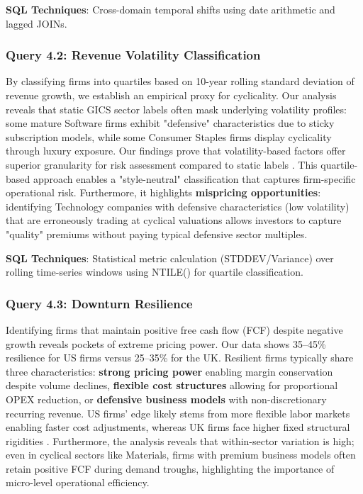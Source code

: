 \documentclass[10pt,a4paper]{article}
\begin{document}
\textbf{SQL Techniques}: Cross-domain temporal shifts using date arithmetic and lagged JOINs.


\subsubsection{Query 4.2: Revenue Volatility Classification}
By classifying firms into quartiles based on 10-year rolling standard deviation of revenue growth, we establish an empirical proxy for cyclicality. Our analysis reveals that static GICS sector labels often mask underlying volatility profiles: some mature Software firms exhibit "defensive" characteristics due to sticky subscription models, while some Consumer Staples firms display cyclicality through luxury exposure. Our findings prove that volatility-based factors offer superior granularity for risk assessment compared to static labels \cite{campbell2001}. This quartile-based approach enables a "style-neutral" classification that captures firm-specific operational risk. Furthermore, it highlights \textbf{mispricing opportunities}: identifying Technology companies with defensive characteristics (low volatility) that are erroneously trading at cyclical valuations allows investors to capture "quality" premiums without paying typical defensive sector multiples.

\textbf{SQL Techniques}: Statistical metric calculation (STDDEV/Variance) over rolling time-series windows using NTILE() for quartile classification.



\subsubsection{Query 4.3: Downturn Resilience}
Identifying firms that maintain positive free cash flow (FCF) despite negative growth reveals pockets of extreme pricing power. Our data shows 35--45\% resilience for US firms versus 25--35\% for the UK. Resilient firms typically share three characteristics: \textbf{strong pricing power} enabling margin conservation despite volume declines, \textbf{flexible cost structures} allowing for proportional OPEX reduction, or \textbf{defensive business models} with non-discretionary recurring revenue. US firms' edge likely stems from more flexible labor markets enabling faster cost adjustments, whereas UK firms face higher fixed structural rigidities \cite{chen2012}. Furthermore, the analysis reveals that within-sector variation is high; even in cyclical sectors like Materials, firms with premium business models often retain positive FCF during demand troughs, highlighting the importance of micro-level operational efficiency.
\end{document}
